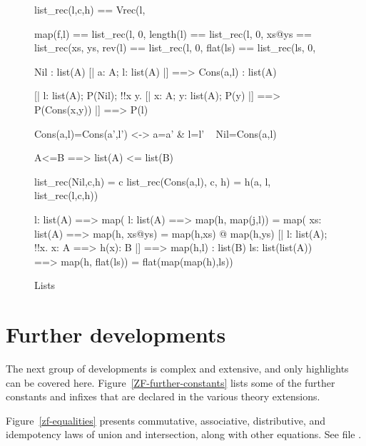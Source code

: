 \begin{figure}\underscoreon %
\begin{ttbox}
    list_rec(l,c,h) == 
                Vrec(l, %

         map(f,l)  == list_rec(l,  0,  %
      length(l) == list_rec(l,  0,  %
         xs@ys     == list_rec(xs, ys, %
         rev(l)    == list_rec(l,  0,  %
        flat(ls)  == list_rec(ls, 0,  %

            Nil : list(A)
           [| a: A;  l: list(A) |] ==> Cons(a,l) : list(A)

    [| l: list(A);
       P(Nil);
       !!x y. [| x: A;  y: list(A);  P(y) |] ==> P(Cons(x,y))
    |] ==> P(l)

        Cons(a,l)=Cons(a',l') <-> a=a' & l=l'
    ~ Nil=Cons(a,l)

       A<=B ==> list(A) <= list(B)

    list_rec(Nil,c,h) = c
   list_rec(Cons(a,l), c, h) = h(a, l, list_rec(l,c,h))

       l: list(A) ==> map(%
     l: list(A) ==> map(h, map(j,l)) = map(%
 xs: list(A) ==> map(h, xs@ys) = map(h,xs) @ map(h,ys)
    [| l: list(A);  !!x. x: A ==> h(x): B |] ==> map(h,l) : list(B)
    ls: list(list(A)) ==> map(h, flat(ls)) = flat(map(map(h),ls))
\end{ttbox}
\caption{Lists} \label{zf-list}
\end{figure}

\section{Further developments}
The next group of developments is complex and extensive, and only
highlights can be covered here.  Figure~\ref{ZF-further-constants} lists
some of the further constants and infixes that are declared in the various
theory extensions.

Figure~\ref{zf-equalities} presents commutative, associative, distributive,
and idempotency laws of union and intersection, along with other equations.
See file .

